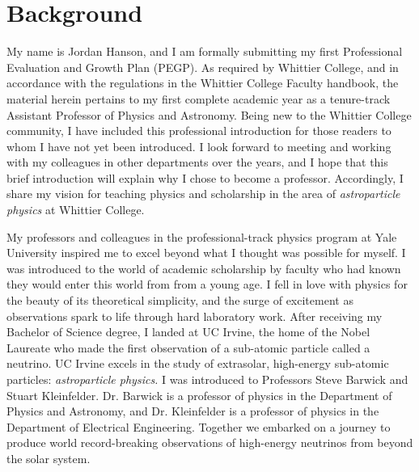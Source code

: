\documentclass[../../main.tex]{subfiles}
\begin{document}
\section{Background}

My name is Jordan Hanson, and I am formally submitting my first Professional Evaluation and Growth Plan (PEGP).  As required by Whittier College, and in accordance with the regulations in the Whittier College Faculty handbook, the material herein pertains to my first complete academic year as a tenure-track Assistant Professor of Physics and Astronomy.  Being new to the Whittier College community, I have included this professional introduction for those readers to whom I have not yet been introduced.  I look forward to meeting and working with my colleagues in other departments over the years, and I hope that this brief introduction will explain why I chose to become a professor.  Accordingly, I share my vision for teaching physics and scholarship in the area of \textit{astroparticle physics} at Whittier College. \\ \hspace{0.1cm}

My professors and colleagues in the professional-track physics program at Yale University inspired me to excel beyond what I thought was possible for myself.  I was introduced to the world of academic scholarship by faculty who had known they would enter this world from from a young age.  I fell in love with physics for the beauty of its theoretical simplicity, and the surge of excitement as observations spark to life through hard laboratory work.  After receiving my Bachelor of Science degree, I landed at UC Irvine, the home of the Nobel Laureate who made the first observation of a sub-atomic particle called a neutrino.  UC Irvine excels in the study of extrasolar, high-energy sub-atomic particles: \textit{astroparticle physics.}  I was introduced to Professors Steve Barwick and Stuart Kleinfelder.  Dr. Barwick is a professor of physics in the Department of Physics and Astronomy, and Dr. Kleinfelder is a professor of physics in the Department of Electrical Engineering.  Together we embarked on a journey to produce world record-breaking observations of high-energy neutrinos from beyond the solar system. \\ \hspace{0.1cm}
\end{document}
